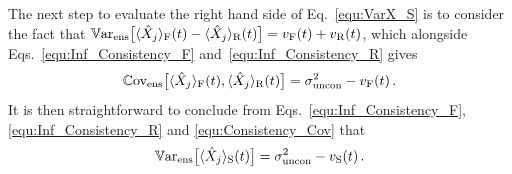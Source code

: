 \documentclass[aps,prx,onecolumn,superscriptaddress,floatfix,longbibliography,amsmath,amssymb]{revtex4-2}
\newcommand{\fil}{_{\text F}}
\newcommand{\rfil}{_{\text R}}
\newcommand{\sm}{_{\text S}}
\newcommand{\dd}{{\rm d}}
\newcommand{\beq}{\begin{equation}}
\newcommand{\eeq}{\end{equation}}
\begin{document}

The next step to evaluate the right hand side of Eq.~\eqref{equ:VarX_S} is to consider the fact that $\mathbb{V}\text{ar}_{\text{ens}}\big[\langle\hat{X}_j\rangle_\text{F}(t)-\langle\hat{X}_j\rangle_\text{R}(t)\big]=v\fil(t)+v\rfil(t)$, which alongside Eqs.~\eqref{equ:Inf_Consistency_F} and~\eqref{equ:Inf_Consistency_R} gives
\begin{equation}
    \mathbb{C}\text{ov}_{\text{ens}}\big[\langle\hat{X}_j\rangle_\text{F}(t),\langle\hat{X}_j\rangle_\text{R}(t)\big]=\sigma^2_\text{uncon} - v\fil(t)\,.
    \label{equ:Consistency_Cov}
\end{equation}
It is then straightforward to conclude from Eqs.~\eqref{equ:Inf_Consistency_F}, \eqref{equ:Inf_Consistency_R} and \eqref{equ:Consistency_Cov} that
\begin{equation}
    \mathbb{V}\text{ar}_{\text{ens}}\big[\langle\hat{X}_j\rangle_\text{S}(t)\big] = \sigma^2_\text{uncon} - v\sm(t)\,.
\end{equation}
\end{document}
